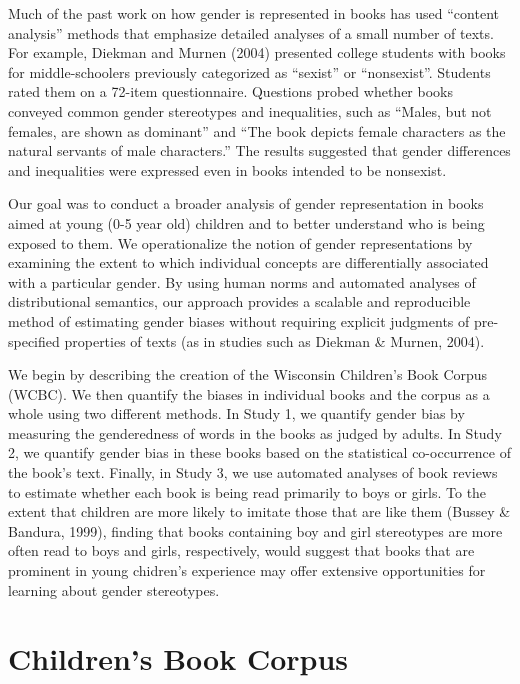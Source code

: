 \documentclass[
  english,
  ,man,floatsintext]{apa6}
\begin{document}
Much of the past work on how gender is represented in books has used \enquote{content analysis} methods that emphasize detailed analyses of a small number of texts. For example, Diekman and Murnen (2004) presented college students with books for middle-schoolers previously categorized as \enquote{sexist} or \enquote{nonsexist}. Students rated them on a 72-item questionnaire. Questions probed whether books conveyed common gender stereotypes and inequalities, such as \enquote{Males, but not females, are shown as dominant} and \enquote{The book depicts female characters as the natural servants of male characters.} The results suggested that gender differences and inequalities were expressed even in books intended to be nonsexist.

Our goal was to conduct a broader analysis of gender representation in books aimed at young (0-5 year old) children and to better understand who is being exposed to them. We operationalize the notion of gender representations by examining the extent to which individual concepts are differentially associated with a particular gender. By using human norms and automated analyses of distributional semantics, our approach provides a scalable and reproducible method of estimating gender biases without requiring explicit judgments of pre-specified properties of texts (as in studies such as Diekman \& Murnen, 2004).

We begin by describing the creation of the Wisconsin Children's Book Corpus (WCBC). We then quantify the biases in individual books and the corpus as a whole using two different methods. In Study 1, we quantify gender bias by measuring the genderedness of words in the books as judged by adults. In Study 2, we quantify gender bias in these books based on the statistical co-occurrence of the book's text. Finally, in Study 3, we use automated analyses of book reviews to estimate whether each book is being read primarily to boys or girls. To the extent that children are more likely to imitate those that are like them (Bussey \& Bandura, 1999), finding that books containing boy and girl stereotypes are more often read to boys and girls, respectively, would suggest that books that are prominent in young chidren's experience may offer extensive opportunities for learning about gender stereotypes.

\hypertarget{childrens-book-corpus}{%
\section{Children's Book Corpus}\label{childrens-book-corpus}}
\end{document}
